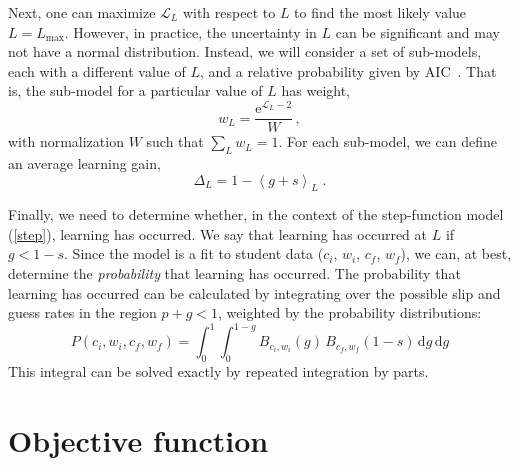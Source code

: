 \documentclass[11pt,letterpaper]{article}
\begin{document}
%
Next, one can maximize $\mathcal{L}_L$ with respect to $L$ to find
the most likely value $L=L_\mathrm{max}$.  However, in practice, the 
uncertainty in $L$ can be significant and may not have a normal
distribution.   Instead, we will consider a set of sub-models, each with a 
different value of $L$, and a relative probability given by 
AIC~\cite{aic-book}.  
That is, the sub-model for a particular value of $L$ has weight,
%
\begin{equation}
                   w_L = \frac{\mathrm{e}^{\mathcal{L}_L-2} }{W}\, ,
\end{equation}
%
with normalization $W$ such that $\sum_L w_L=1$.
For each sub-model, we can define an average learning gain,
%
\begin{equation}
         \Delta_L = 1- \left\langle g+s \right\rangle_L \; .
\end{equation}

Finally, we need to determine whether, in the context
of the step-function model (\ref{step}), learning has occurred.
We say that learning has occurred at $L$ if $g<1-s$.
Since the model is a fit to student data ($c_i$, $w_i$, $c_f$, $w_f$), 
we can, at best, determine the {\em probability} that learning has occurred. 
The probability that learning has occurred can be calculated by
integrating over the possible slip and guess rates in the region
$p+g<1$, weighted by the probability distributions:
%
\begin{equation}
   P(c_i, w_i, c_f, w_f)= \int_0^1 \int_0^{1-g} 
   B_{c_i,w_i}(g) \, B_{c_f,w_f}(1-s) \,\mathrm{d}g\,\mathrm{d}g 
\end{equation}
%
This integral can be solved exactly by repeated integration by parts.


\section{Objective function}
\end{document}
